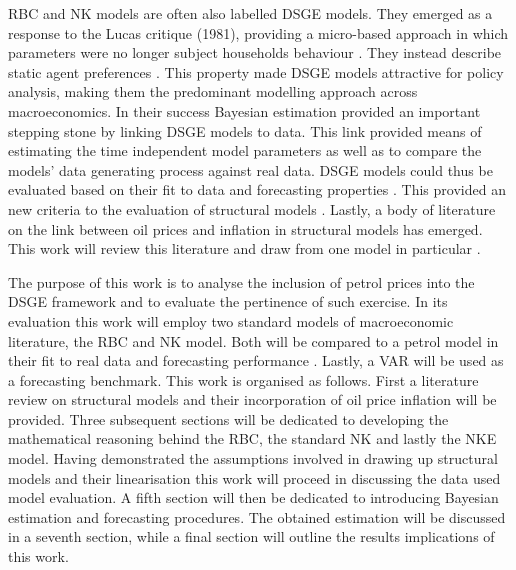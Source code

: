 \documentclass[12pt,a4paper,english]{article} %
\begin{document}
	 \ac{RBC} and \ac{NK} models are often also labelled \ac{DSGE} models. They emerged as a response to the Lucas critique (1981), providing a micro-based approach in which parameters were no longer subject households behaviour \cite{lucas_jr_tobin_1981}. They instead describe static agent preferences \cite{gali_monetary_2008}. This property made DSGE models attractive for policy analysis, making them the predominant modelling approach across macroeconomics. In their success Bayesian estimation provided an important stepping stone by linking \ac{DSGE} models to data. This link provided means of estimating the time independent model parameters as well as to compare the models' data generating process against real data. DSGE models could thus be evaluated based on their fit to data and forecasting properties \cite{del_negro_forming_2008}. This provided an new criteria to the evaluation of structural models \cite{kocherlakota_model_2007}. Lastly, a body of literature on the link between oil prices and inflation in structural models has emerged. This work will review this literature and draw from one model in particular \cite{blanchard_macroeconomic_2007}. 
	 
	 The purpose of this work is to analyse the inclusion of petrol prices into the DSGE framework and to evaluate the pertinence of such exercise. In its evaluation this work will employ two standard models of macroeconomic literature, the RBC and NK model. Both will be compared to a petrol model in their fit to real data and forecasting performance . Lastly, a \ac{VAR} will be used as a forecasting benchmark. This work is organised as follows. First a literature review on structural models and their incorporation of oil price inflation will be provided. Three subsequent sections will be dedicated to developing the mathematical reasoning behind the RBC, the standard NK and lastly the \ac{NKE} model. Having demonstrated the assumptions involved in drawing up structural models and their linearisation this work will proceed in discussing the data used model evaluation. A fifth section will then be dedicated to introducing Bayesian estimation and forecasting procedures. The obtained estimation will  be discussed in a seventh section, while a final section will outline the results implications of this work.
	 
\end{document}
